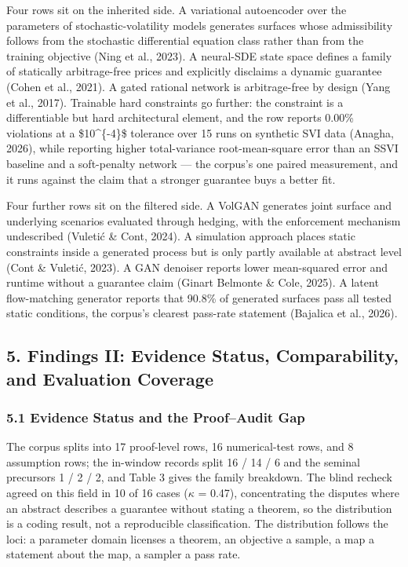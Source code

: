 \documentclass[11pt]{article}
\begin{document}
Four rows sit on the inherited side. A variational autoencoder over the parameters of stochastic-volatility models generates surfaces whose admissibility follows from the stochastic differential equation class rather than from the training objective (Ning et al., 2023). A neural-SDE state space defines a family of statically arbitrage-free prices and explicitly disclaims a dynamic guarantee (Cohen et al., 2021). A gated rational network is arbitrage-free by design (Yang et al., 2017). Trainable hard constraints go further: the constraint is a differentiable but hard architectural element, and the row reports 0.00\% violations at a \$10\textasciicircum{}\{-4\}\$ tolerance over 15 runs on synthetic SVI data (Anagha, 2026), while reporting higher total-variance root-mean-square error than an SSVI baseline and a soft-penalty network — the corpus's one paired measurement, and it runs against the claim that a stronger guarantee buys a better fit.

Four further rows sit on the filtered side. A VolGAN generates joint surface and underlying scenarios evaluated through hedging, with the enforcement mechanism undescribed (Vuletić \& Cont, 2024). A simulation approach places static constraints inside a generated process but is only partly available at abstract level (Cont \& Vuletić, 2023). A GAN denoiser reports lower mean-squared error and runtime without a guarantee claim (Ginart Belmonte \& Cole, 2025). A latent flow-matching generator reports that 90.8\% of generated surfaces pass all tested static conditions, the corpus's clearest pass-rate statement (Bajalica et al., 2026).

\subsection*{5. Findings II: Evidence Status, Comparability, and Evaluation Coverage}
\subsubsection*{5.1 Evidence Status and the Proof–Audit Gap}
The corpus splits into 17 proof-level rows, 16 numerical-test rows, and 8 assumption rows; the in-window records split 16 / 14 / 6 and the seminal precursors 1 / 2 / 2, and Table 3 gives the family breakdown. The blind recheck agreed on this field in 10 of 16 cases ($\kappa$ = 0.47), concentrating the disputes where an abstract describes a guarantee without stating a theorem, so the distribution is a coding result, not a reproducible classification. The distribution follows the loci: a parameter domain licenses a theorem, an objective a sample, a map a statement about the map, a sampler a pass rate.
\end{document}
